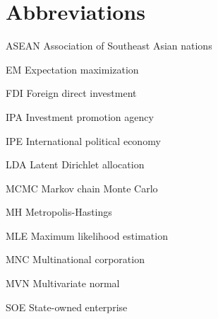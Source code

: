 \abbreviations





\section*{Abbreviations}

\begin{symbollist}
\item[ASEAN] Association of Southeast Asian nations
  \item[EM] Expectation maximization
	\item[FDI] Foreign direct investment
  \item[IPA] Investment promotion agency
  \item[IPE] International political economy
  \item[LDA] Latent Dirichlet allocation
	\item[MCMC] Markov chain Monte Carlo
  \item[MH] Metropolis-Hastings
	\item[MLE] Maximum likelihood estimation
  \item[MNC] Multinational corporation
  \item[MVN] Multivariate normal
  \item[SOE] State-owned enterprise
\end{symbollist}

